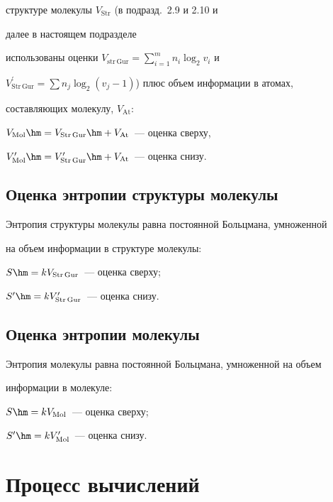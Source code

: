 структуре молекулы $V_{\mathrm{Str}}$ (в подразд.~2.9 и 2.10 и 


далее в настоящем подразделе


использованы оценки $V_{\mathrm{str\,Gur}}=\sum\limits_{i=1}^m n_i\log_2 v_i$ и 


$V^\prime_{\mathrm{Str\,Gur}}=\sum n_j \log_2(v_j-1)$) плюс объем информации в атомах, 


составляющих молекулу, $V_{\mathrm{At}}$: 


   $V_{\mathrm{Mol}} \hm= V_{\mathrm{Str\,Gur}} \hm+ V_{\mathrm{At}}$~--- оценка сверху, 


   $V^\prime_{\mathrm{Mol}} \hm= 


V^\prime_{\mathrm{Str\,Gur}} \hm+ V_{\mathrm{At}}$~--- оценка снизу.





\subsection{Оценка энтропии {} структуры молекулы}


   


   Энтропия структуры молекулы равна постоянной Больцмана, умноженной 


на объем информации в структуре молекулы:


   $S \hm= kV_{\mathrm{Str\,Gur}}$~--- оценка сверху;


$S^\prime \hm= kV^\prime_{\mathrm{Str\,Gur}}$~--- оценка снизу.





\subsection{Оценка энтропии{} молекулы}


   


   Энтропия молекулы равна постоянной Больцмана, умноженной на объем 


информации в молекуле:  


   $S \hm= kV_{\mathrm{Mol}}$~--- оценка сверху;


      $S^\prime \hm= kV^\prime_{\mathrm{Mol}}$~--- оценка снизу.


   


\section{Процесс вычислений}


